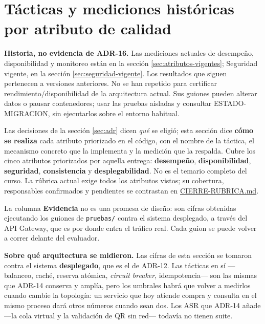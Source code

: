 \documentclass[11pt,a4paper]{article}
\begin{document}










\section{Tácticas y mediciones históricas por atributo de calidad}
\textbf{Historia, no evidencia de ADR-16.} Las mediciones actuales de desempeño, disponibilidad
y monitoreo están en la sección \ref{sec:atributos-vigentes}; Seguridad vigente,
en la sección \ref{sec:seguridad-vigente}. Los resultados que siguen pertenecen
a versiones anteriores. No se han repetido para certificar rendimiento/disponibilidad de la arquitectura
actual. Sus guiones pueden alterar datos o pausar contenedores; usar las pruebas aisladas
y consultar ESTADO-MIGRACION, sin ejecutarlos sobre el entorno habitual.

\label{sec:tacticas}

Las decisiones de la sección \ref{sec:adr} dicen \textit{qué} se eligió; esta sección dice
\textbf{cómo se realiza} cada atributo priorizado en el código, con el nombre de la táctica, el
mecanismo concreto que la implementa y la medición que la respalda. Cubre los cinco atributos
priorizados por aquella entrega: \textbf{desempeño}, \textbf{disponibilidad},
\textbf{seguridad}, \textbf{consistencia} y \textbf{desplegabilidad}.
No es el temario completo del curso. La rúbrica actual exige todos los atributos
vistos; su cobertura, responsables confirmados y pendientes se contrastan en
\href{https://github.com/Emperador24/HEXACORE/blob/main/Documentation/Work/CIERRE-RUBRICA.md}{CIERRE-RUBRICA.md}.

La columna \textbf{Evidencia} no es una promesa de diseño: son cifras obtenidas ejecutando los
guiones de \texttt{pruebas/} contra el sistema desplegado, a través del API Gateway, que es por
donde entra el tráfico real. Cada guion se puede volver a correr delante del evaluador.

\medskip
\noindent\textbf{Sobre qué arquitectura se midieron.} Las cifras de esta sección se tomaron contra
el sistema \textbf{desplegado}, que es el de ADR-12. Las tácticas en sí ---balanceo, caché, reserva
atómica, \textit{circuit breaker}, idempotencia--- son las mismas que ADR-14 conserva y amplía, pero
los umbrales habrá que volver a medirlos cuando cambie la topología: un servicio que hoy atiende
compra y consulta en el mismo proceso dará otros números cuando sean dos. Los ASR que ADR-14 añade
---la cola virtual y la validación de QR sin red--- todavía no tienen suite.
\end{document}
